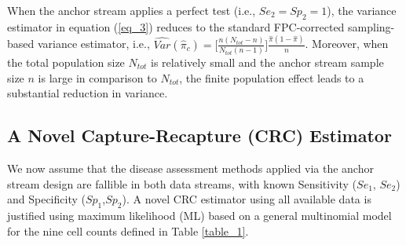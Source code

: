 \documentclass[useAMS,usenatbib,referee]{biom}
\begin{document}
When the anchor stream applies a perfect test (i.e., $Se_2=Sp_2=1$), the variance estimator in equation (\ref{eq_3}) reduces to the standard FPC-corrected sampling-based variance estimator, i.e., $\hat{Var}(\hat{\pi}_c) = \big[\frac{n(N_{tot}-n)}{N_{tot}(n-1)} \big] \frac{\hat{\pi}(1-\hat{\pi})}{n}$. Moreover, when the total population size $N_{tot}$ is relatively small and the anchor stream sample size $n$ is large in comparison to $N_{tot}$, the finite population effect leads to a substantial reduction in variance.

\subsection{A Novel Capture-Recapture (CRC) Estimator}

We now assume that the disease assessment methods applied via the anchor stream design are fallible in both data streams, with known Sensitivity ($Se_1$, $Se_2$) and Specificity ($Sp_1$,$Sp_2$). A novel CRC estimator using all available data is justified using maximum likelihood (ML) based on a general multinomial model for the nine cell counts defined in Table \ref{table_1}.
\end{document}
